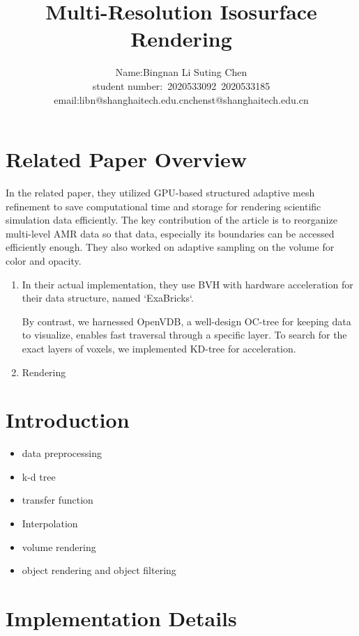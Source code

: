 \documentclass[acmtog]{acmart}
\title{Multi-Resolution Isosurface Rendering}
\author{Name:\quad Bingnan Li \quad Suting Chen \\ student number:\ 2020533092\ 2020533185
\\email:\quad libn@shanghaitech.edu.cn\quad chenst@shanghaitech.edu.cn}
\begin{document}
    \maketitle

    \vspace*{2 ex}


    \section{Related Paper Overview}\label{sec:related-paper-overview}
    In the related paper, they utilized GPU-based structured adaptive mesh refinement to save computational time and storage for rendering scientific simulation data efficiently.
    The key contribution of the article is to reorganize multi-level AMR data so that data, especially its boundaries can be accessed efficiently enough.
    They also worked on adaptive sampling on the volume for color and opacity.
    \begin{enumerate}
        \item In their actual implementation, they use BVH with hardware acceleration for their data structure, named `ExaBricks`.
        \par By contrast, we harnessed OpenVDB, a well-design OC-tree for keeping data to visualize, enables fast traversal through a specific layer. To search for the exact layers of voxels, we implemented KD-tree for acceleration.
        \item Rendering
    \end{enumerate}


    \section{Introduction}\label{sec:introduction}
    \begin{itemize}
        \item data preprocessing
        \item k-d tree
        \item transfer function
        \item Interpolation
        \item volume rendering
        \item object rendering and object filtering
    \end{itemize}


    \section{Implementation Details}\label{sec:implementation-details}
\end{document}
